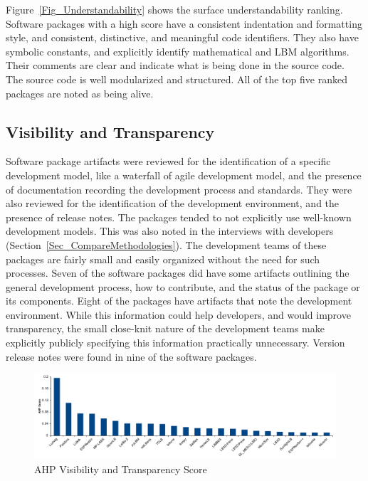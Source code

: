 \documentclass[final, 3p, times, authoryear]{elsarticle}
\begin{document}
Figure~\ref{Fig_Understandability} shows the surface understandability ranking.
Software packages with a high score have a consistent indentation and formatting
style, and consistent, distinctive, and meaningful code identifiers. They also
have symbolic constants, and explicitly identify mathematical and LBM
algorithms. Their comments are clear and indicate what is being done in the
source code. The source code is well modularized and structured. All of the top
five ranked packages are noted as being alive.

\subsection{Visibility and Transparency}

Software package artifacts were reviewed for the identification of a specific
development model, like a waterfall of agile development model, and the presence
of documentation recording the development process and standards. They were also
reviewed for the identification of the development environment, and the presence
of release notes. The packages tended to not explicitly use well-known
development models. This was also noted in the interviews with developers
(Section~\ref{Sec_CompareMethodologies}). The development teams of these
packages are fairly small and easily organized without the need for such
processes. Seven of the software packages did have some artifacts outlining the
general development process, how to contribute, and the status of the package or
its components. Eight of the packages have artifacts that note the development
environment. While this information could help developers, and would improve
transparency, the small close-knit nature of the development teams make
explicitly publicly specifying this information practically unnecessary. Version
release notes were found in nine of the software packages.

\begin{figure}[h!]
	\begin{center}
		\includegraphics[width=1.0\textwidth]{./figures/visibilitytransparency_chart.pdf}
		\caption{AHP Visibility and Transparency Score}
		\label{Fig_VisibilityTransparency}
	\end{center}
\end{figure}
\end{document}
